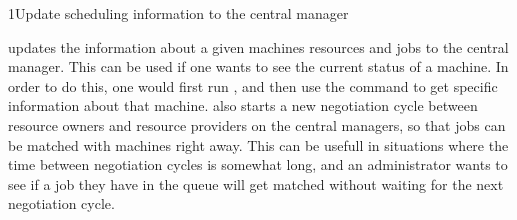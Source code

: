 \begin{ManPage}{}{1}{Update scheduling information to the
central manager}
\label{man-condor-reschedule}
\Synopsis {}

\Description 

 updates the information about a given machines resources
and jobs to the central manager.  This can be used if one wants to see the
current status of a machine.  In order to do this, one would first run
, and then use the  command to get 
specific information about that machine.   also
starts a new negotiation cycle between resource owners and resource providers
on the central managers, so that jobs can be matched with machines right
away.  This can be usefull in situations where the time between negotiation
cycles is somewhat long, and an administrator wants to see if a job they have
in the queue will get matched without waiting for the next negotiation cycle.

\begin{Options}
\end{Options}

\end{ManPage}
